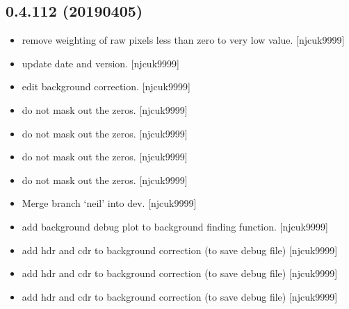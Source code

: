 \documentclass[a4paper,10pt,english]{report}
\begin{document}
\subsection{0.4.112 (2019\sphinxhyphen{}04\sphinxhyphen{}05)}
\label{\detokenize{misc/changelog:id167}}\begin{itemize}
\item {} 
 \sphinxhyphen{} remove weighting of raw pixels less than zero to very
low value. {[}njcuk9999{]}

\item {} 
 \sphinxhyphen{} update date and version. {[}njcuk9999{]}

\item {} 
 \sphinxhyphen{} edit background correction. {[}njcuk9999{]}

\item {} 
 \sphinxhyphen{} do not mask out the zeros. {[}njcuk9999{]}

\item {} 
 \sphinxhyphen{} do not mask out the zeros. {[}njcuk9999{]}

\item {} 
 \sphinxhyphen{} do not mask out the zeros. {[}njcuk9999{]}

\item {} 
 \sphinxhyphen{} do not mask out the zeros. {[}njcuk9999{]}

\item {} 
Merge branch ‘neil’ into dev. {[}njcuk9999{]}

\item {} 
 \sphinxhyphen{} add background debug plot to background finding
function. {[}njcuk9999{]}

\item {} 
 \sphinxhyphen{} add hdr and cdr to background correction (to save
debug file) {[}njcuk9999{]}

\item {} 
 \sphinxhyphen{} add hdr and cdr to background correction (to
save debug file) {[}njcuk9999{]}

\item {} 
 \sphinxhyphen{} add hdr and cdr to background correction
(to save debug file) {[}njcuk9999{]}


\end{itemize}
\end{document}
